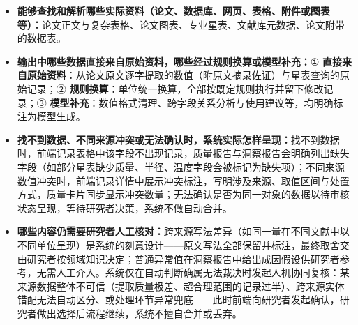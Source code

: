 \begin{itemize}[leftmargin=1.2em,itemsep=2pt]
\item \textbf{能够查找和解析哪些实际资料（论文、数据库、网页、表格、附件或图表等）：}论文正文与复杂表格、论文图表、专业星表、文献库元数据、论文附带的数据表。
\item \textbf{输出中哪些数据直接来自原始资料，哪些经过规则换算或模型补充：}① \textbf{直接来自原始资料}：从论文原文逐字提取的数值（附原文摘录佐证）与星表查询的原始记录；② \textbf{规则换算}：单位统一换算，全部按既定规则执行并留下修改记录；③ \textbf{模型补充}：数值格式清理、跨字段关系分析与使用建议等，均明确标注为模型生成。
\item \textbf{找不到数据、不同来源冲突或无法确认时，系统实际怎样呈现：}找不到数据时，前端记录表格中该字段不出现记录，质量报告与洞察报告会明确列出缺失字段（如部分星表缺少质量、半径、温度字段会被标记为缺失项）；不同来源数值冲突时，前端记录详情中展示冲突标注，写明涉及来源、取值区间与处置方式，质量卡片同步显示冲突数量；无法确认是否为同一对象的数据以待审核状态呈现，等待研究者决策，系统不做自动合并。
\item \textbf{哪些内容仍需要研究者人工核对：}跨来源写法差异（如同一量在不同文献中以不同单位呈现）是系统的刻意设计——原文写法全部保留并标注，最终取舍交由研究者按领域知识决定；普通异常值在洞察报告中给出成因假设供研究者参考，无需人工介入。系统仅在自动判断确属无法裁决时发起人机协同复核：某来源数据整体不可信（提取质量极差、超合理范围的记录过半）、跨来源实体错配无法自动区分、或处理环节异常兜底——此时前端向研究者发起确认，研究者做出选择后流程继续，系统不擅自合并或丢弃。
\end{itemize}
